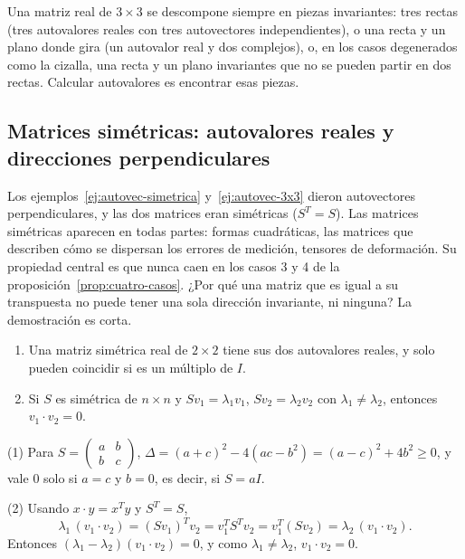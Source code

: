 \begin{idea}
Una matriz real de \(3\times3\) se descompone siempre en piezas invariantes: tres rectas
(tres autovalores reales con tres autovectores independientes), o una recta y un plano
donde gira (un autovalor real y dos complejos), o, en los casos degenerados como la cizalla,
una recta y un plano invariantes que no se pueden partir en dos rectas. Calcular autovalores
es encontrar esas piezas.
\end{idea}

\subsection{Matrices simétricas: autovalores reales y direcciones perpendiculares}\label{sec:simetricas}

Los ejemplos~\ref{ej:autovec-simetrica} y~\ref{ej:autovec-3x3} dieron autovectores
perpendiculares, y las dos matrices eran simétricas (\(S^T=S\)). Las matrices simétricas
aparecen en todas partes: formas cuadráticas, las matrices que describen cómo se dispersan
los errores de medición, tensores de deformación. Su propiedad central es que nunca caen en los casos 3 y 4 de la
proposición~\ref{prop:cuatro-casos}. ¿Por qué una matriz que es igual a su transpuesta no
puede tener una sola dirección invariante, ni ninguna? La demostración es corta.

\begin{proposicion}\label{prop:simetrica}
\begin{enumerate}
  \item Una matriz simétrica real de \(2\times2\) tiene sus dos autovalores reales, y solo
  pueden coincidir si es un múltiplo de \(I\).
  \item Si \(S\) es simétrica de \(n\times n\) y \(Sv_1=\lambda_1v_1\), \(Sv_2=\lambda_2v_2\)
  con \(\lambda_1\neq\lambda_2\), entonces \(v_1\cdot v_2=0\).
\end{enumerate}
\end{proposicion}

\begin{demostracion}
(1) Para \(S=\left(\begin{smallmatrix}a&b\\b&c\end{smallmatrix}\right)\),
\(\Delta=(a+c)^2-4(ac-b^2)=(a-c)^2+4b^2\ge0\), y vale \(0\) solo si \(a=c\) y \(b=0\), es
decir, si \(S=aI\).

(2) Usando \(x\cdot y=x^Ty\) y \(S^T=S\),
\[
  \lambda_1\,(v_1\cdot v_2)=(Sv_1)^Tv_2=v_1^TS^Tv_2=v_1^T(Sv_2)=\lambda_2\,(v_1\cdot v_2).
\]
Entonces \((\lambda_1-\lambda_2)(v_1\cdot v_2)=0\), y como \(\lambda_1\neq\lambda_2\),
\(v_1\cdot v_2=0\).
\end{demostracion}

